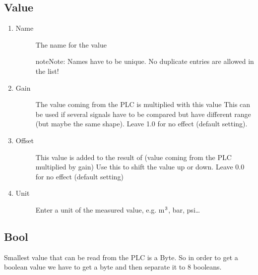 \documentclass[a4paper,10pt,english]{sphinxmanual}
\begin{document}
\subsection{Value}
\label{\detokenize{values:value}}
\begin{enumerate}
%
\item {} \begin{description}
\item[{Name}] \leavevmode
The name for the value

\begin{sphinxadmonition}{note}{Note:}
Names have to be unique. No duplicate entries are allowed in the list!
\end{sphinxadmonition}

\end{description}

\item {} \begin{description}
\item[{Gain}] \leavevmode
The value coming from the PLC is multiplied with this value
This can be used if several signals have to be compared
but have different range (but maybe the same shape). Leave 1.0 for no effect (default setting).

\end{description}

\item {} \begin{description}
\item[{Offset}] \leavevmode
This value is added to the result of (value coming from the PLC multiplied by gain)
Use this to shift the value up or down. Leave 0.0 for no effect (default setting)

\end{description}

\item {} \begin{description}
\item[{Unit}] \leavevmode
Enter a unit of the measured value, e.g. m\(\sp{\text{3}}\), bar, psi…

\end{description}

\end{enumerate}


\subsection{Bool}
\label{\detokenize{values:bool}}
Smallest value that can be read from the PLC is a Byte.
So in order to get a boolean value we have to get a byte and then separate it to 8 booleans.
\end{document}
